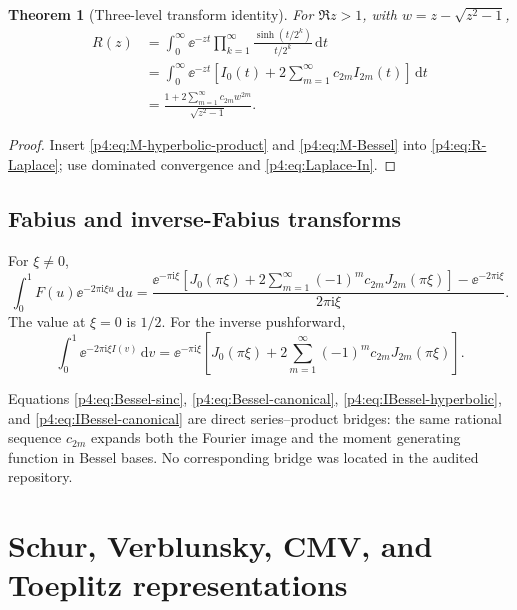 \documentclass[11pt,oneside]{article}
\newtheorem{theorem}{Theorem}[section]
\theoremstyle{definition}
\newcommand{\dd}{\,\mathrm d}
\newcommand{\ii}{\mathrm i}
\begin{document}
\begin{theorem}[Three-level transform identity]
\label{p4:thm:Laplace-Bessel-Jouk}
For \(\Re z>1\), with \(w=z-\sqrt{z^2-1}\),
\begin{align}
 R(z)
 &=\int_0^{\infty}\ee^{-zt}
 \prod_{k=1}^{\infty}\frac{\sinh(t/2^k)}{t/2^k}\dd t
 \label{p4:eq:R-Laplace-product-new}\\
 &=\int_0^{\infty}\ee^{-zt}\left[I_0(t)+2\sum_{m=1}^{\infty}c_{2m}I_{2m}(t)\right]\dd t
 \label{p4:eq:R-Laplace-Bessel}\\
 &=\frac{1+2\sum_{m=1}^{\infty}c_{2m}w^{2m}}{\sqrt{z^2-1}}.
 \label{p4:eq:R-Laplace-Jouk}
\end{align}
\end{theorem}

\begin{proof}
Insert \eqref{p4:eq:M-hyperbolic-product} and \eqref{p4:eq:M-Bessel} into
\eqref{p4:eq:R-Laplace}; use dominated convergence and \eqref{p4:eq:Laplace-In}.
\end{proof}

\subsection{Fabius and inverse-Fabius transforms}

For \(\xi\ne0\),
\begin{equation}
 \int_0^1F(u)\ee^{-2\pi\ii\xi u}\dd u
 =\frac{\ee^{-\pi\ii\xi}
 \left[J_0(\pi\xi)+2\sum_{m=1}^{\infty}(-1)^mc_{2m}J_{2m}(\pi\xi)\right]
 -\ee^{-2\pi\ii\xi}}{2\pi\ii\xi}.
 \label{p4:eq:F-Bessel-transform}
\end{equation}
The value at \(\xi=0\) is \(1/2\). For the inverse pushforward,
\begin{equation}
 \int_0^1\ee^{-2\pi\ii\xi I(v)}\dd v
 =\ee^{-\pi\ii\xi}\left[J_0(\pi\xi)+2\sum_{m=1}^{\infty}(-1)^mc_{2m}J_{2m}(\pi\xi)\right].
 \label{p4:eq:I-Bessel-transform}
\end{equation}

\begin{novelbox}
Equations \eqref{p4:eq:Bessel-sinc}, \eqref{p4:eq:Bessel-canonical},
\eqref{p4:eq:IBessel-hyperbolic}, and \eqref{p4:eq:IBessel-canonical} are direct series--product
bridges: the same rational sequence \(c_{2m}\) expands both the Fourier image and the moment
generating function in Bessel bases. No corresponding bridge was located in the audited
repository.
\end{novelbox}

\section{Schur, Verblunsky, CMV, and Toeplitz representations}
\label{p4:sec:opuc}
\end{document}
